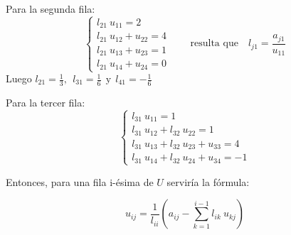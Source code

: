 Para la segunda fila:
\[
\begin{cases}
  l_{21} ~ u_{11} = 2 \\
  l_{21} ~ u_{12} + u_{22} = 4 \\
  l_{21} ~ u_{13} + u_{23} = 1 \\
  l_{21} ~ u_{14} + u_{24} = 0
\end{cases} \qquad \text{resulta que} \quad l_{j1}=\frac{a_{j1}}{u_{11}}
\]
Luego \(l_{21} = \frac{1}{3}, ~~ l_{31} = \frac{1}{6} ~~ \text{y} ~~ l_{41} = -\frac{1}{6}\)

Para la tercer fila:
\[
\begin{cases}
  l_{31} ~ u_{11} = 1 \\
  l_{31} ~ u_{12} + l_{32} ~ u_{22} = 1 \\
  l_{31} ~ u_{13} + l_{32} ~ u_{23} + u_{33} = 4 \\
  l_{31} ~ u_{14} + l_{32} ~ u_{24} + u_{34} = -1 
\end{cases}
\]

Entonces, para una fila i-ésima de \(U\) serviría la fórmula:
\begin{tcolorbox}[myconclusion]
  \[u_{ij} = \frac{1}{l_{ii}}\left(a_{ij}-\sum_{k=1}^{i-1}l_{ik}~u_{kj}\right)\]
\end{tcolorbox}

